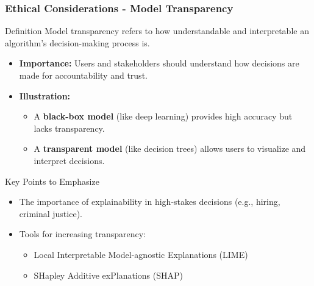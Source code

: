 \documentclass{beamer}
\begin{document}
\begin{frame}[fragile]
    \frametitle{Ethical Considerations - Model Transparency}
    \begin{block}{Definition}
        Model transparency refers to how understandable and interpretable an algorithm's decision-making process is.
    \end{block}
    
    \begin{itemize}
        \item \textbf{Importance:} Users and stakeholders should understand how decisions are made for accountability and trust.
        \item \textbf{Illustration:} 
        \begin{itemize}
            \item A \textbf{black-box model} (like deep learning) provides high accuracy but lacks transparency.
            \item A \textbf{transparent model} (like decision trees) allows users to visualize and interpret decisions.
        \end{itemize}
    \end{itemize}

    \begin{block}{Key Points to Emphasize}
        \begin{itemize}
            \item The importance of explainability in high-stakes decisions (e.g., hiring, criminal justice).
            \item Tools for increasing transparency:
            \begin{itemize}
                \item Local Interpretable Model-agnostic Explanations (LIME)
                \item SHapley Additive exPlanations (SHAP)
            \end{itemize}
        \end{itemize}
    \end{block}
\end{frame}
\end{document}
